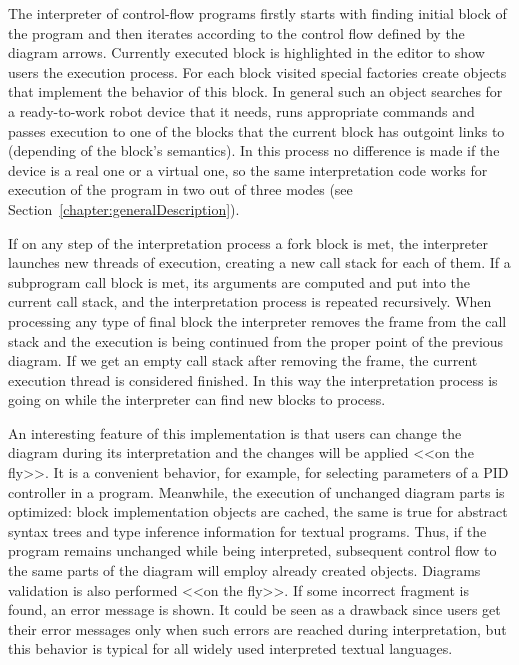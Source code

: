 \documentclass[conference]{IEEEtran}
\begin{document}
The interpreter of control-flow programs firstly starts with finding initial block of the program and then iterates according to the control flow defined by the diagram arrows. Currently executed block is highlighted in the editor to show users the execution process. For each block visited special factories create objects that implement the behavior of this block. In general such an object searches for a ready-to-work robot device that it needs, runs appropriate commands and passes execution to one of the blocks that the current block has outgoint links to (depending of the block's semantics). In this process no difference is made if the device is a real one or a virtual one, so the same interpretation code works for execution of the program in two out of three modes (see Section~\ref{chapter:generalDescription}).

If on any step of the interpretation process a fork block is met, the interpreter launches new threads of execution, creating a new call stack for each of them. If a subprogram call block is met, its arguments are computed and put into the current call stack, and the interpretation process is repeated recursively. When processing any type of final block the interpreter removes the frame from the call stack and the execution is being continued from the proper point of the previous diagram. If we get an empty call stack after removing the frame, the current execution thread is considered finished. In this way the interpretation process is going on while the interpreter can find new blocks to process.

An interesting feature of this implementation is that users can change the diagram during its interpretation and the changes will be applied <<on the fly>>. It is a convenient behavior, for example, for selecting parameters of a PID controller in a program. Meanwhile, the execution of unchanged diagram parts is optimized: block implementation objects are cached, the same is true for abstract syntax trees and type inference information for textual programs. Thus, if the program remains unchanged while being interpreted, subsequent control flow to the same parts of the diagram will employ already created objects. Diagrams validation is also performed <<on the fly>>. If some incorrect fragment is found, an error message is shown. It could be seen as a drawback since users get their error messages only when such errors are reached during interpretation, but this behavior is typical for all widely used interpreted textual languages.
\end{document}
